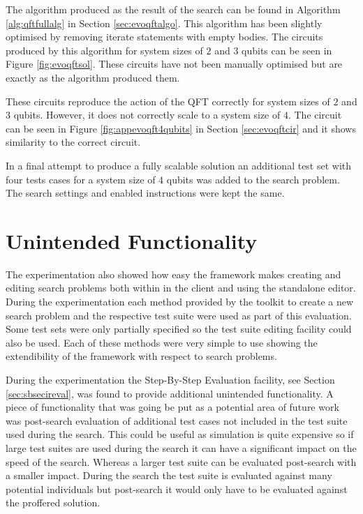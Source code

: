 The algorithm produced as the result of the search can be found in Algorithm \ref{alg:qftfullalg} in Section \ref{sec:evoqftalgo}.
This algorithm has been slightly optimised by removing iterate statements with empty bodies.
The circuits produced by this algorithm for system sizes of $2$ and $3$ qubits can be seen in Figure \ref{fig:evoqftsol}.
These circuits have not been manually optimised but are exactly as the algorithm produced them.

These circuits reproduce the action of the QFT correctly for system sizes of $2$ and $3$ qubits.
However, it does not correctly scale to a system size of $4$.
The circuit can be seen in Figure \ref{fig:appevoqft4qubits} in Section \ref{sec:evoqftcir} and it shows similarity to the correct circuit.

In a final attempt to produce a fully scalable solution an additional test set with four tests cases for a system size of $4$ qubits was added to the search problem.
The search settings and enabled instructions were kept the same.




\section{Unintended Functionality}

The experimentation also showed how easy the framework makes creating and editing search problems both within in the client and using the standalone editor.
During the experimentation each method provided by the toolkit to create a new search problem and the respective test suite were used as part of this evaluation.
Some test sets were only partially specified so the test suite editing facility could also be used.
Each of these methods were very simple to use showing the extendibility of the framework with respect to search problems.

During the experimentation the Step-By-Step Evaluation facility, see Section \ref{sec:sbsecireval}, was found to provide additional unintended functionality.
A piece of functionality that was going be put as a potential area of future work was post-search evaluation of additional test cases not included in the test suite used during the search.
This could be useful as simulation is quite expensive so if large test suites are used during the search it can have a significant impact on the speed of the search.
Whereas a larger test suite can be evaluated post-search with a smaller impact.
During the search the test suite is evaluated against many potential individuals but post-search it would only have to be evaluated against the proffered solution.

